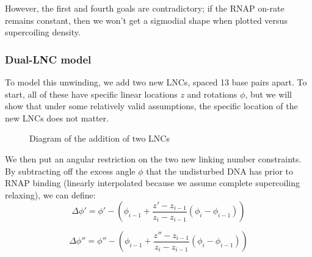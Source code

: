 \documentclass[11pt]{article}
\begin{document}
However, the first and fourth goals are contradictory; if the RNAP on-rate remains constant, then we won't get a sigmodial shape when plotted versus supercoiling density.

\FloatBarrier
\subsubsection{Dual-LNC model}
To model this unwinding, we add two new LNCs, spaced 13 base pairs apart. To start, all of these have specific linear locations \(z\) and rotations \(\phi\), but we will show that under some relatively valid assumptions, the specific location of the new LNCs does not matter.

\begin{figure}[h]
    \centering
    \caption{Diagram of the addition of two LNCs}
    \label{fig:lnc_diagram}
\end{figure}

We then put an angular restriction on the two new linking number constraints. By subtracting off the excess angle \(\phi\) that the undisturbed DNA has prior to RNAP binding (linearly interpolated because we assume complete supercoiling relaxing), we can define:
\begin{equation}
    \Delta \phi' = \phi' - \left(\phi_{i - 1} + \frac{z' - z_{i-1}}{z_i - z_{i-1}} (\phi_i - \phi_{i-1})\right)
\end{equation}

\begin{equation}
    \Delta \phi'' = \phi'' - \left(\phi_{i - 1} + \frac{z'' - z_{i-1}}{z_i - z_{i-1}} (\phi_i - \phi_{i-1})\right)
\end{equation}
\end{document}
